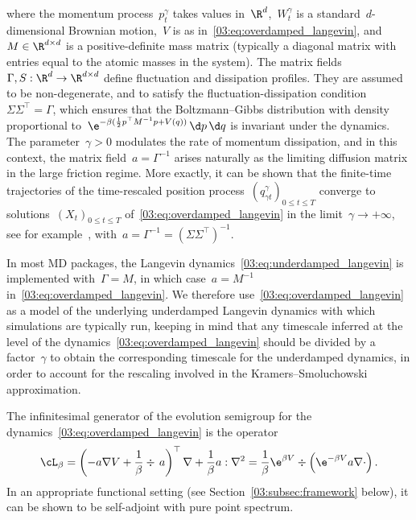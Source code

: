     where the momentum process~$p^\gamma_t$ takes values in~$\R^{d}$,~$W_t^\gamma$ is a standard~$d$-dimensional Brownian motion,~$V$ is as in~\eqref{03:eq:overdamped_langevin}, and~$M\in\R^{d\times d}$ is a positive-definite mass matrix (typically a diagonal matrix with entries equal to the atomic masses in the system).
    The matrix fields~$\Gamma,S:\R^d\to \R^{d\times d}$ define fluctuation and dissipation profiles. They are assumed to be non-degenerate, and to satisfy the fluctuation-dissipation condition~$ \Sigma \Sigma^\top  = \Gamma$, which ensures that the Boltzmann--Gibbs distribution with density proportional to~$\e^{-\beta(\frac12p^\top M^{-1}p + V(q))}\,\d p\,\d q$ is invariant under the dynamics.
    The parameter~$\gamma>0$ modulates the rate of momentum dissipation, and in this context, the matrix field~$a = \Gamma^{-1}$ arises naturally as the limiting diffusion matrix in the large friction regime.
    More exactly, it can be shown that the finite-time trajectories of the time-rescaled position process~$(q^\gamma_{\gamma t})_{0\leq t\leq T}$ converge to solutions~$(X_t)_{0\leq t \leq T}$ of~\eqref{03:eq:overdamped_langevin} in the limit~$\gamma\to +\infty$, see for example~\cite{HMVW15}, with~$a=\Gamma^{-1}=\left(\Sigma\Sigma^\top\right)^{-1}$.

    In most MD packages, the Langevin dynamics~\eqref{03:eq:underdamped_langevin} is implemented with~$\Gamma = M$, in which case~$a=M^{-1}$ in~\eqref{03:eq:overdamped_langevin}. We therefore use~\eqref{03:eq:overdamped_langevin} as a model of the underlying underdamped Langevin dynamics with which simulations are typically run, keeping in mind that any timescale inferred at the level of the dynamics~\eqref{03:eq:overdamped_langevin} should be divided by a factor~$\gamma$ to obtain the corresponding timescale for the underdamped dynamics, in order to account for the rescaling involved in the Kramers--Smoluchowski approximation.

    The infinitesimal generator of the evolution semigroup for the dynamics~\eqref{03:eq:overdamped_langevin} is the operator
    \begin{equation}
        \label{03:eq:generator}
        \cL_\beta = \left(-a\nabla V + \frac1\beta\div\,a\right)^\top\nabla + \frac1\beta a:\nabla^2 = \frac1\beta\e^{\beta V}\div\left(\e^{-\beta V} a \nabla \cdot \right).
    \end{equation}
    In an appropriate functional setting (see Section~\ref{03:subsec:framework} below), it can be shown to be self-adjoint with pure point spectrum.

